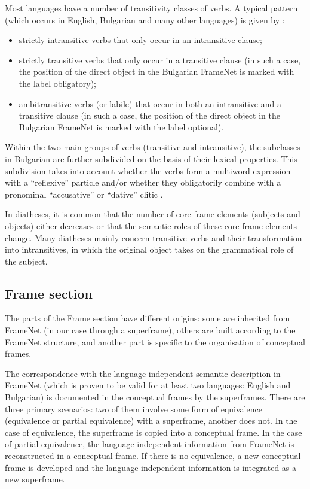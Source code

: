 \documentclass[output=paper,colorlinks,citecolor=brown]{langscibook}
\begin{document}
Most languages have a number of transitivity classes of verbs. A typical pattern (which occurs in English, Bulgarian and many other languages) is given by \citet[4]{Dixon-2000}:
\begin{itemize}
\item strictly intransitive verbs that only occur in an intransitive clause;
\item strictly transitive verbs that only occur in a transitive clause (in such a case, the position of the direct object in the Bulgarian FrameNet is marked with the label obligatory);
\item ambitransitive verbs (or labile) that occur in both an intransitive and a transitive clause (in such a case, the position of the direct object in the Bulgarian FrameNet is marked with the label optional).
\end{itemize}

Within the two main groups of verbs (transitive and intransitive), the subclasses in Bulgarian are further subdivided on the basis of their lexical properties. This subdivision takes into account whether the verbs form a multiword expression with a ``reflexive'' particle and/or whether they obligatorily combine with a pronominal ``accusative'' or ``dative'' clitic \citep[34]{Koeva2010}.

In diatheses, it is common that the number of core frame elements (subjects and objects) either decreases or that the semantic roles of these core frame elements change. Many diatheses mainly concern transitive verbs and their transformation into intransitives, in which the original object takes on the grammatical role of the subject.

\subsection{Frame section}

The parts of the Frame section have different origins: some are inherited from FrameNet (in our case through a superframe), others are built according to the FrameNet structure, and another part is specific to the organisation of conceptual frames.

The correspondence with the language-independent semantic description in FrameNet (which is proven to be valid for at least two languages: English and Bulgarian) is documented in the conceptual frames by the superframes. There are three primary scenarios: two of them involve some form of equivalence (equivalence or partial equivalence) with a superframe, another does not. In the case of equivalence, the superframe is copied into a conceptual frame. In the case of partial equivalence, the language-independent information from FrameNet is reconstructed in a conceptual frame. If there is no equivalence, a new conceptual frame is developed and the language-independent information is integrated as a new superframe.
\end{document}
